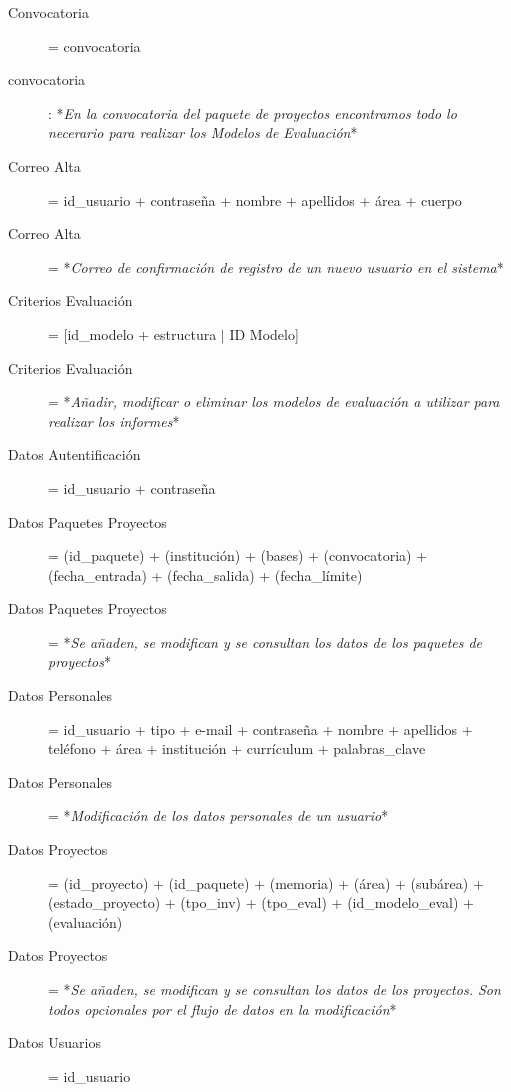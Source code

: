 \documentclass[12pt,a4paper,titlepage,spanish,twoside]{book}
\begin{document}
\begin{description}
\item[Convocatoria] = convocatoria

\item[convocatoria]: *\emph{En la convocatoria del paquete de proyectos
    encontramos todo lo necerario para realizar los Modelos de Evaluación}* 

\item[Correo Alta] = id\_usuario + contraseña + nombre + apellidos + área +
  cuerpo 

\item[Correo Alta] = *\emph{Correo de confirmación de registro de un nuevo
    usuario en el sistema}* 

\item[Criterios Evaluación] = [id\_modelo + estructura $\mid$ ID Modelo]

\item[Criterios Evaluación] = *\emph{Añadir, modificar o eliminar los modelos
    de evaluación a utilizar para realizar los informes}* 

\item[Datos Autentificación] = id\_usuario + contraseña

\item[Datos Paquetes Proyectos] = (id\_paquete) + (institución) + (bases) +
  (convocatoria) + (fecha\_entrada) + (fecha\_salida) + (fecha\_límite) 

\item[Datos Paquetes Proyectos] = *\emph{Se añaden, se modifican y se
    consultan los datos de los paquetes de proyectos}* 

\item[Datos Personales] = id\_usuario + tipo + e-mail + contraseña + nombre +
  apellidos + teléfono + área + institución + currículum + palabras\_clave 

\item[Datos Personales] = *\emph{Modificación de los datos personales de un
    usuario}* 

\item[Datos Proyectos] = (id\_proyecto) + (id\_paquete) + (memoria) + (área)
  + (subárea) + (estado\_proyecto) + (tpo\_inv) + (tpo\_eval) +
  (id\_modelo\_eval) + (evaluación) 

\item[Datos Proyectos] = *\emph{Se añaden, se modifican y se consultan los
    datos de los proyectos. Son todos opcionales por el flujo de datos en la
    modificación}* 

\item[Datos Usuarios] = id\_usuario


\end{description}
\end{document}
